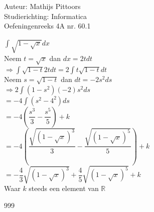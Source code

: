 \documentclass[a4paper]{article}
\newcommand{\intt}{\displaystyle\int}
\begin{document}
  
\noindent \large Auteur: Mathijs Pittoors \\
\noindent \large Studierichting: Informatica\\
\noindent \large Oefeningenreeks 4A nr. 60.1\\

\medskip

\normalsize

$\intt \sqrt{1-\sqrt{x}}dx$\\

Neem $t = \sqrt{x}$ dan $dx = 2t dt$\\

$\Rightarrow \intt \sqrt{1-t}2tdt = 2 \intt t \sqrt{1-t}dt$\\

Neem $s = \sqrt{1-t}$ dan $dt = -2s^2ds$\\

$\Rightarrow 2 \intt (1-s^2)(-2)s^2 ds$ \\

$= -4 \intt (s^2 - 4^2)ds$\\

$=-4\left(\dfrac{s^3}{3}-\dfrac{s^5}{5}\right) + k$\\

$=-4\left(\dfrac{\sqrt{(1-\sqrt{x})^3}}{3}-\dfrac{\sqrt{(1-\sqrt{x})^5}}{5}\right) + k$\\

$=-\dfrac{4}{3}\sqrt{(1-\sqrt{x})^3} + \dfrac{4}{5} \sqrt{(1-\sqrt{x})^5} + k$\\

Waar $k$ steeds een element van $\mathbb{R}$


\begin{thebibliography}{999}
\end{thebibliography}
\end{document}
